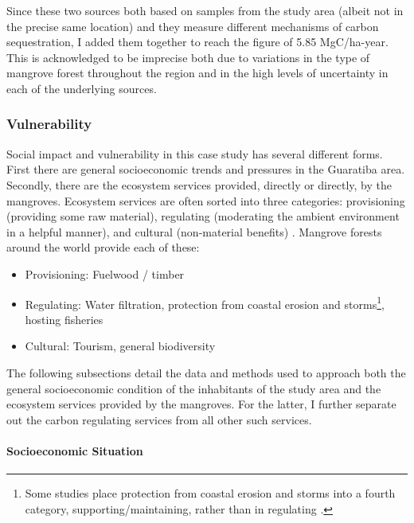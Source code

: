 Since these two sources both based on samples from the study area (albeit not in the precise same location) and they measure different mechanisms of carbon sequestration, I added them together to reach the figure of 5.85 MgC/ha-year. This is acknowledged to be imprecise both due to variations in the type of mangrove forest throughout the region and in the high levels of uncertainty in each of the underlying sources.

\subsubsection{Vulnerability} \label{sec:rio-vulnerability}

Social impact and vulnerability in this case study has several different forms. First there are general socioeconomic trends and pressures in the Guaratiba area. Secondly, there are the ecosystem services provided, directly or directly, by the mangroves. Ecosystem services are often sorted into three categories: provisioning (providing some raw material), regulating (moderating the ambient environment in a helpful manner), and cultural (non-material benefits) \cite{haines-youngCommonInternationalClassification2018}. Mangrove forests around the world provide each of these:

\begin{itemize}[itemsep=0pt,parsep=0pt]
	\item{Provisioning: Fuelwood / timber}
	\item{Regulating: Water filtration, protection from coastal erosion and storms\footnote{Some studies place protection from coastal erosion and storms into a fourth category, supporting/maintaining, rather than in regulating \cite{getznerEcosystemServicesMangrove2020}.}, hosting fisheries}
	\item{Cultural: Tourism, general biodiversity}
\end{itemize}

The following subsections detail the data and methods used to approach both the general socioeconomic condition of the inhabitants of the study area and the ecosystem services provided by the mangroves. For the latter, I further separate out the carbon regulating services from all other such services.

\paragraph{Socioeconomic Situation} \leavevmode\newline

